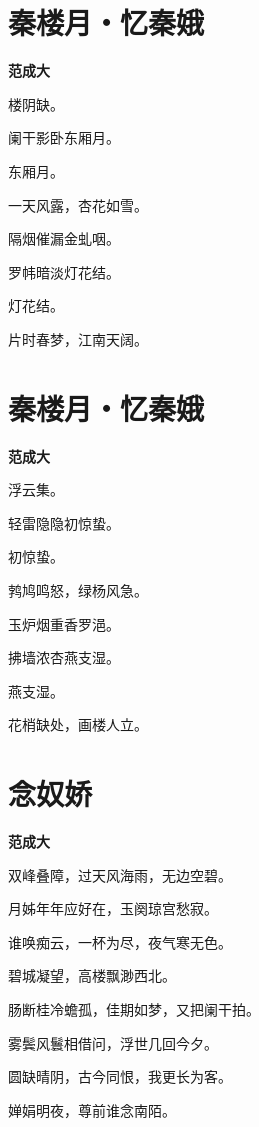 \documentclass[12pt,a4paper]{ctexbook}
\begin{document}
\section{秦楼月・忆秦娥}
\textbf{范成大}\par\vspace{0.5em}
楼阴缺。\par
阑干影卧东厢月。\par
东厢月。\par
一天风露，杏花如雪。\par
隔烟催漏金虬咽。\par
罗帏暗淡灯花结。\par
灯花结。\par
片时春梦，江南天阔。\par

\section{秦楼月・忆秦娥}
\textbf{范成大}\par\vspace{0.5em}
浮云集。\par
轻雷隐隐初惊蛰。\par
初惊蛰。\par
鹁鸠鸣怒，绿杨风急。\par
玉炉烟重香罗浥。\par
拂墙浓杏燕支湿。\par
燕支湿。\par
花梢缺处，画楼人立。\par

\section{念奴娇}
\textbf{范成大}\par\vspace{0.5em}
双峰叠障，过天风海雨，无边空碧。\par
月姊年年应好在，玉阕琼宫愁寂。\par
谁唤痴云，一杯为尽，夜气寒无色。\par
碧城凝望，高楼飘渺西北。\par
肠断桂冷蟾孤，佳期如梦，又把阑干拍。\par
雾鬓风鬟相借问，浮世几回今夕。\par
圆缺晴阴，古今同恨，我更长为客。\par
婵娟明夜，尊前谁念南陌。\par
\end{document}
